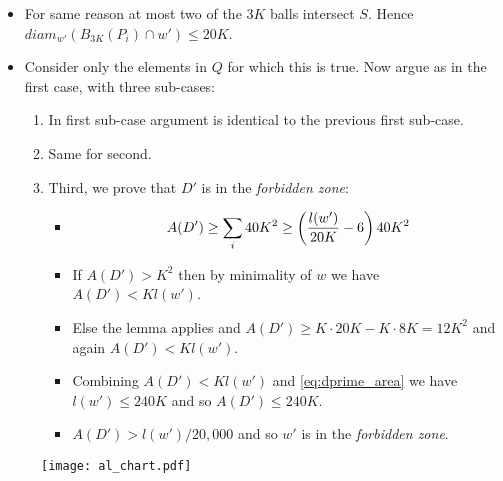 \documentclass[11pt]{article} \usepackage{amssymb}
\begin{document}
\begin{enumerate}
\begin{itemize}
\begin{enumerate}
\begin{itemize}
        \item For same reason at most two of the $3K$ balls intersect
          $S$. Hence $diam_{w'}(B_{3K}(P_i)\cap w') \leq 20K$.
        \item Consider only the elements in $Q$ for which this is true.
          Now argue as in the first case, with three sub-cases:
          \begin{enumerate}
          \item In first sub-case argument is identical to the previous first 
            sub-case.
          \item Same for second.
          \item Third, we prove that $D'$ is in the {\em forbidden zone}:
            \begin{itemize}
            \item 
              \begin{equation}
                \label{eq:dprime_area}
                A(D')\geq \sum_i 40K^2\geq \left({l(w')\over 20K}-6\right)40K^2
              \end{equation}
            \item If $A(D')>K^2$ then by minimality of $w$ we have 
              $A(D')<Kl(w')$. 
            \item Else the lemma applies and 
              $A(D')\geq K \cdot 20K - K \cdot 8K=12K^2$ and again 
              $A(D')<Kl(w')$. 
            \item Combining $A(D')<Kl(w')$ and \eqref{eq:dprime_area} we have
              $l(w')\leq 240K$ and so $A(D')\leq 240K$.
            \item $A(D')>l(w')/20,000$ and so $w'$ is in the 
              {\em forbidden zone}.
            \end{itemize}
          \end{enumerate}
          
        \end{itemize}
      \end{enumerate}
    \end{itemize}
\end{enumerate}
\begin{figure}[htp]
  \label{fig:axes}
  \centering
  \texttt{[image: al\_chart.pdf]}    
\end{figure}
\end{document}
